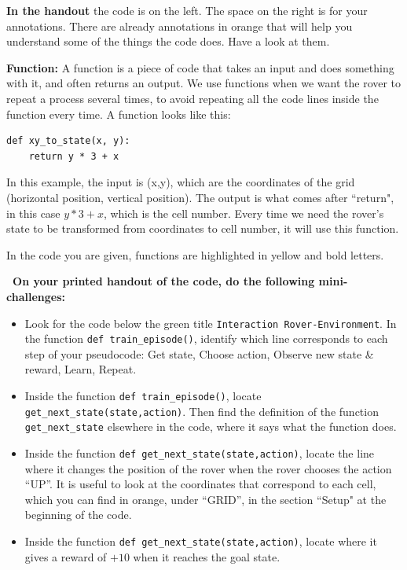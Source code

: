 \documentclass[12pt]{article}
\begin{document}
\begin{importantbox}
\textbf{In the handout} the code is on the left. The space on the right is for your annotations. There are already annotations in orange that will help you understand some of the things the code does. Have a look at them.

\textbf{Function:} A function is a piece of code that takes an input and does something with it, and often returns an output. We use functions when we want the rover to repeat a process several times, to avoid repeating all the code lines inside the function every time. A function looks like this:

\begin{lstlisting}[style=micropython]
def xy_to_state(x, y):
    return y * 3 + x
\end{lstlisting}

In this example, the input is (x,y), which are the coordinates of the grid (horizontal position, vertical position). The output is what comes after ``return", in this case $y * 3 + x$, which is the cell number. Every time we need the rover's state to be transformed from coordinates to cell number, it will use this function. 

In the code you are given, functions are highlighted in yellow and bold letters.

\end{importantbox}

\textcolor{maincolor}{\textbf{\faPen\ On your printed handout of the code, do the following mini-challenges:}}

\begin{itemize}
  \item[$\square$] Look for the code below the green title \texttt{Interaction Rover-Environment}. In the function \texttt{def train\_episode()}, identify which line corresponds to each step of your pseudocode: Get state, Choose action, Observe new state \& reward, Learn, Repeat.
  \item[$\square$] Inside the function \texttt{def train\_episode()}, locate \nolinkurl{get_next_state(state,action)}. Then find the definition of the function \nolinkurl{get_next_state} elsewhere in the code, where it says what the function does.
  \item[$\square$] Inside the function \texttt{def get\_next\_state(state,action)}, locate the line where it changes the position of the rover when the rover chooses the action ``UP''. It is useful to look at the coordinates that correspond to each cell, which you can find in orange, under ``GRID'', in the section ``Setup" at the beginning of the code.
  \item[$\square$] Inside the function \texttt{def get\_next\_state(state,action)}, locate where it gives a reward of $+10$ when it reaches the goal state.

\end{itemize}
\end{document}
